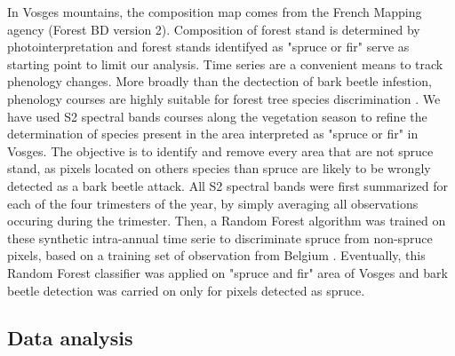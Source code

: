 \documentclass[3p,times]{elsarticle}
\begin{document}
In Vosges mountains, the composition map comes from the French Mapping agency (Forest BD version 2). 
Composition of forest stand is determined by photointerpretation and forest stands identifyed as "spruce or fir" serve as starting point to limit our analysis.
Time series are a convenient means to track phenology changes. 
More broadly than the dectection of bark beetle infestion, phenology courses are highly suitable for forest tree species discrimination \citep{lisein_discrimination_2015,grabska_forest_2019,ma_tree_2021}.
We have used S2 spectral bands courses along the vegetation season to refine the determination of species present in the area interpreted as "spruce or fir" in Vosges.
The objective is to identify and remove every area that are not spruce stand, as pixels located on others species than spruce are likely to be wrongly detected as a bark beetle attack.
All S2 spectral bands were first summarized for each of the four trimesters of the year, by simply averaging all observations occuring during the trimester.
Then, a Random Forest algorithm was trained on these synthetic intra-annual time serie to discriminate spruce from non-spruce pixels, based on a training set of observation from Belgium \citep{bolyn_forest_2018}.
Eventually, this Random Forest classifier was applied on "spruce and fir" area of Vosges and bark beetle detection was carried on only for pixels detected as spruce. 





\subsection{Data analysis}


\end{document}
